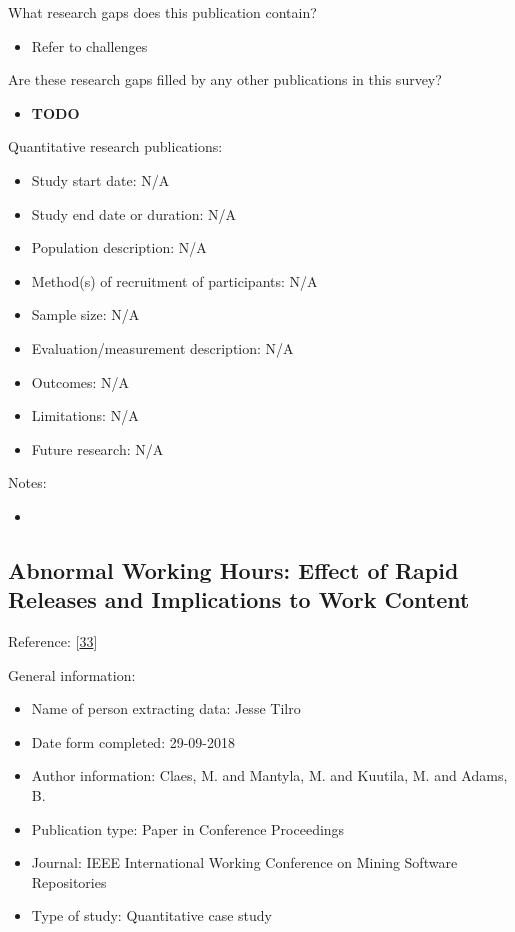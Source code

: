 \documentclass[]{book}
\providecommand{\tightlist}{%
  \setlength{\itemsep}{0pt}\setlength{\parskip}{0pt}}
\begin{document}
What research gaps does this publication contain?

\begin{itemize}
\tightlist
\item
  Refer to challenges
\end{itemize}

Are these research gaps filled by any other publications in this survey?

\begin{itemize}
\tightlist
\item
  \textbf{TODO}
\end{itemize}

Quantitative research publications:

\begin{itemize}
\tightlist
\item
  Study start date: N/A
\item
  Study end date or duration: N/A
\item
  Population description: N/A
\item
  Method(s) of recruitment of participants: N/A
\item
  Sample size: N/A
\item
  Evaluation/measurement description: N/A
\item
  Outcomes: N/A
\item
  Limitations: N/A
\item
  Future research: N/A
\end{itemize}

Notes:

\begin{itemize}
\item
\end{itemize}

\subsection{Abnormal Working Hours: Effect of Rapid Releases and
Implications to Work
Content}\label{abnormal-working-hours-effect-of-rapid-releases-and-implications-to-work-content}

Reference: {[}\protect\hyperlink{ref-claes2017a}{33}{]}

General information:

\begin{itemize}
\tightlist
\item
  Name of person extracting data: Jesse Tilro
\item
  Date form completed: 29-09-2018
\item
  Author information: Claes, M. and Mantyla, M. and Kuutila, M. and
  Adams, B.
\item
  Publication type: Paper in Conference Proceedings
\item
  Journal: IEEE International Working Conference on Mining Software
  Repositories
\item
  Type of study: Quantitative case study
\end{itemize}
\end{document}
